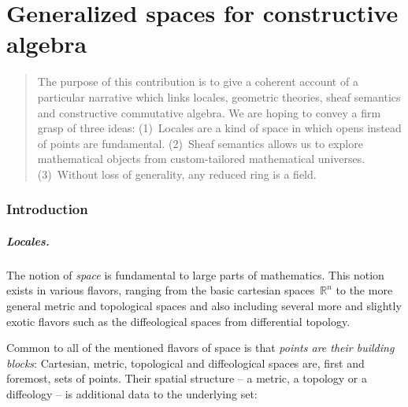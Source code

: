 \documentclass{ws-rv9x6}
\newcommand{\RR}{\mathbb{R}}
\renewcommand{\_}{\mathpunct{.}}
\newcommand{\?}{\,{:}\,}
\begin{document}
\chapter{Generalized spaces for constructive algebra}

\author[I. Blechschmidt]{Ingo Blechschmidt}

\address{Università di Verona \\
Department of Computer Science \\
Strada le Grazie 15 \\
37134 Verona, Italy}

\begin{abstract}
The purpose of this contribution is to give a coherent account of a particular
narrative which links locales, geometric theories, sheaf semantics and
constructive commutative algebra. We are hoping to convey a firm grasp of three
ideas:
(1)~Locales are a kind of space in which opens instead of points are
fundamental.
(2)~Sheaf semantics allows us to explore mathematical objects from custom-tailored
mathematical universes.
(3)~Without loss of generality, any reduced ring is a field.
\end{abstract}
\body

\tableofcontents

\subsection*{Introduction}

\paragraph{Locales.}

The notion of \emph{space} is fundamental to large parts of mathematics. This notion
exists in various flavors, ranging from the basic cartesian spaces~$\RR^n$ to
the more general metric and topological spaces and also including several more
and slightly exotic flavors such as the diffeological spaces from differential topology.

Common to all of the mentioned flavors of space is that \emph{points are their
building blocks}: Cartesian, metric, topological and diffeological spaces are,
first and foremost, sets of points. Their spatial structure -- a metric, a
topology or a diffeology -- is additional data to the underlying set:
\end{document}
